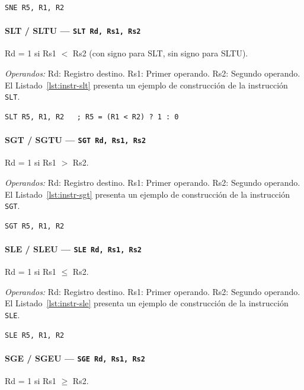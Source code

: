 \documentclass[../main.tex]{subfiles}
\begin{document}
\begin{lstlisting}[caption={SNE},label={lst:instr-sne}]
	SNE R5, R1, R2
\end{lstlisting}

\paragraph*{SLT / SLTU --- \texttt{SLT Rd, Rs1, Rs2}}
Rd = 1 si Rs1 $<$ Rs2 (con signo para SLT, sin signo para SLTU).

\textit{Operandos:} Rd: Registro destino. Rs1: Primer operando. Rs2: Segundo operando.
El Listado~\ref{lst:instr-slt} presenta un ejemplo de construcción de la instrucción \texttt{SLT}.

\begin{lstlisting}[caption={SLT},label={lst:instr-slt}]
	SLT R5, R1, R2   ; R5 = (R1 < R2) ? 1 : 0
\end{lstlisting}

\paragraph*{SGT / SGTU --- \texttt{SGT Rd, Rs1, Rs2}}
Rd = 1 si Rs1 $>$ Rs2.

\textit{Operandos:} Rd: Registro destino. Rs1: Primer operando. Rs2: Segundo operando.
El Listado~\ref{lst:instr-sgt} presenta un ejemplo de construcción de la instrucción \texttt{SGT}.

\begin{lstlisting}[caption={SGT},label={lst:instr-sgt}]
	SGT R5, R1, R2
\end{lstlisting}

\paragraph*{SLE / SLEU --- \texttt{SLE Rd, Rs1, Rs2}}
Rd = 1 si Rs1 $\leq$ Rs2.

\textit{Operandos:} Rd: Registro destino. Rs1: Primer operando. Rs2: Segundo operando.
El Listado~\ref{lst:instr-sle} presenta un ejemplo de construcción de la instrucción \texttt{SLE}.

\begin{lstlisting}[caption={SLE},label={lst:instr-sle}]
	SLE R5, R1, R2
\end{lstlisting}

\paragraph*{SGE / SGEU --- \texttt{SGE Rd, Rs1, Rs2}}
Rd = 1 si Rs1 $\geq$ Rs2.
\end{document}
